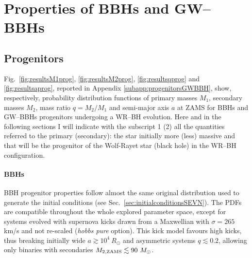 \documentclass[a4paper,titlepage]{book}     	%
\newcommand{\sun}{\ensuremath{_\odot}}
\newcommand{\msun}{\ensuremath{M\sun}}
\newcommand{\rsun}{R_{\odot}}
\begin{document}
\section{Properties of BBHs and GW--BBHs}\label{sec:propertiesBBHsandGWBBHs}
\subsection{Progenitors}\label{subsec:progenitorsBBHsGWBBHs}
Fig.\ \ref{fig:resultsM1prog}, \ref{fig:resultsM2prog}, \ref{fig:resultsqprog} and \ref{fig:resultsaprog}, reported in Appendix \ref{subapp:progenitorsGWBBH}, show, respectively, probability distribution functions of primary masses $M_1$, secondary masses $M_2$, mass ratio $q=M_2/M_1$ and semi-major axis $a$ at ZAMS for BBHs and GW--BBHs progenitors undergoing a WR--BH evolution. Here and in the following sections I will indicate with the subscript 1 (2) all the quantities referred to the primary (secondary): the star initially more (less) massive and that will be the progenitor of the Wolf-Rayet star (black hole) in the WR--BH configuration.

\paragraph{BBHs} BBH progenitor properties follow almost the same original distribution used to generate the initial conditions (see Sec.\ \ref{sec:initialconditionsSEVN}). The PDFs are compatible throughout the whole explored parameter space, except for systems evolved with supernova kicks drawn from a Maxwellian with $\sigma=265$ km/s and not re-scaled (\emph{hobbs pure} option). This kick model favours high kicks, thus breaking initially wide $a \gtrsim 10^4~ \rsun$ and asymmetric systems $q \lesssim 0.2$, allowing only binaries with secondaries $M_{\rm 2,ZAMS} \lesssim 90~\msun$.
\end{document}
